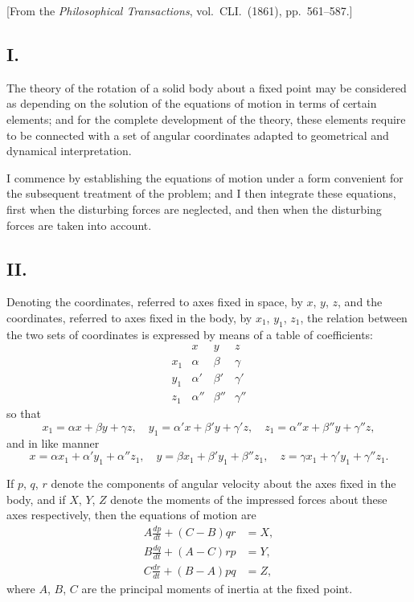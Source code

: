 \documentclass[11pt,a4paper]{book}
\begin{document}
\begin{center}
[From the \textit{Philosophical Transactions}, vol.\ CLI.\ (1861), pp.~561--587.]
\end{center}

\subsection*{I.}

The theory of the rotation of a solid body about a fixed point may be considered as depending on the solution of the equations of motion in terms of certain elements; and for the complete development of the theory, these elements require to be connected with a set of angular coordinates adapted to geometrical and dynamical interpretation.

I commence by establishing the equations of motion under a form convenient for the subsequent treatment of the problem; and I then integrate these equations, first when the disturbing forces are neglected, and then when the disturbing forces are taken into account.

\subsection*{II.}

Denoting the coordinates, referred to axes fixed in space, by $x$, $y$, $z$, and the coordinates, referred to axes fixed in the body, by $x_1$, $y_1$, $z_1$, the relation between the two sets of coordinates is expressed by means of a table of coefficients:
\[
\begin{array}{c|ccc}
 & x & y & z \\
\hline
x_1 & \alpha & \beta & \gamma \\
y_1 & \alpha' & \beta' & \gamma' \\
z_1 & \alpha'' & \beta'' & \gamma''
\end{array}
\]
so that
\[
x_1 = \alpha x + \beta y + \gamma z, \quad
y_1 = \alpha' x + \beta' y + \gamma' z, \quad
z_1 = \alpha'' x + \beta'' y + \gamma'' z,
\]
and in like manner
\[
x = \alpha x_1 + \alpha' y_1 + \alpha'' z_1, \quad
y = \beta x_1 + \beta' y_1 + \beta'' z_1, \quad
z = \gamma x_1 + \gamma' y_1 + \gamma'' z_1.
\]

If $p$, $q$, $r$ denote the components of angular velocity about the axes fixed in the body, and if $X$, $Y$, $Z$ denote the moments of the impressed forces about these axes respectively, then the equations of motion are
\begin{align*}
A\frac{dp}{dt} + (C-B)qr &= X, \\
B\frac{dq}{dt} + (A-C)rp &= Y, \\
C\frac{dr}{dt} + (B-A)pq &= Z,
\end{align*}
where $A$, $B$, $C$ are the principal moments of inertia at the fixed point.
\end{document}
